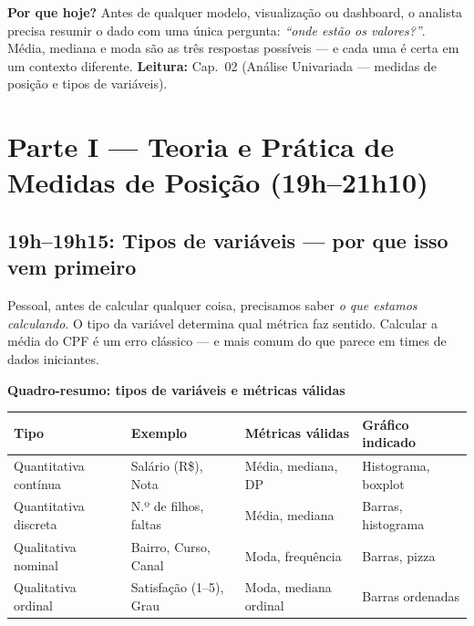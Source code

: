 \begin{NoteBox}
\textbf{Por que hoje?} Antes de qualquer modelo, visualização ou dashboard,
o analista precisa resumir o dado com uma única pergunta: \emph{``onde estão
os valores?''}. Média, mediana e moda são as três respostas possíveis —
e cada uma é certa em um contexto diferente. \textbf{Leitura:} Cap.\ 02
(Análise Univariada — medidas de posição e tipos de variáveis).
\end{NoteBox}

\section{Parte I — Teoria e Prática de Medidas de Posição (19h–21h10)}

\subsection{19h–19h15: Tipos de variáveis — por que isso vem primeiro}

Pessoal, antes de calcular qualquer coisa, precisamos saber \emph{o que
estamos calculando}. O tipo da variável determina qual métrica faz sentido.
Calcular a média do CPF é um erro clássico — e mais comum do que parece em
times de dados iniciantes.

\begin{BoardBox}
\textbf{Quadro-resumo: tipos de variáveis e métricas válidas}
\begin{tabular}{|p{3.0cm}|p{3.0cm}|p{3.2cm}|p{3.4cm}|}
\hline
\textbf{Tipo} & \textbf{Exemplo} & \textbf{Métricas válidas} & \textbf{Gráfico indicado} \\
\hline
Quantitativa contínua  & Salário (R\$), Nota       & Média, mediana, DP         & Histograma, boxplot        \\
\hline
Quantitativa discreta  & N.º de filhos, faltas      & Média, mediana             & Barras, histograma         \\
\hline
Qualitativa nominal    & Bairro, Curso, Canal       & Moda, frequência           & Barras, pizza              \\
\hline
Qualitativa ordinal    & Satisfação (1–5), Grau     & Moda, mediana ordinal      & Barras ordenadas           \\
\hline
\end{tabular}
\end{BoardBox}

